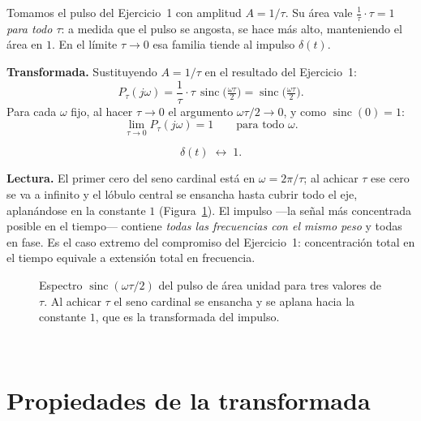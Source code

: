 \documentclass[10pt,a4paper]{article}
\newcommand{\tema}[1]{%
  \bigskip
  \noindent{\color{utnblue}\rule{\linewidth}{1pt}}\\[-0.4em]
  \section*{#1}
  \vspace{-0.6em}
}
\begin{document}
	Tomamos el pulso del Ejercicio~1 con amplitud $A=1/\tau$. Su área vale $\tfrac{1}{\tau}\cdot\tau=1$ \emph{para todo $\tau$}: a medida que el pulso se angosta, se hace más alto, manteniendo el área en $1$. En el límite $\tau\to0$ esa familia tiende al impulso $\delta(t)$.

	\textbf{Transformada.} Sustituyendo $A=1/\tau$ en el resultado del Ejercicio~1:
	\[
		P_\tau(j\omega) = \frac{1}{\tau}\cdot\tau\,\operatorname{sinc}\!\Big(\tfrac{\omega\tau}{2}\Big) = \operatorname{sinc}\!\Big(\tfrac{\omega\tau}{2}\Big).
	\]
	Para cada $\omega$ fijo, al hacer $\tau\to0$ el argumento $\omega\tau/2\to0$, y como $\operatorname{sinc}(0)=1$:
	\[
		\lim_{\tau\to0} P_\tau(j\omega) = 1 \qquad \text{para todo } \omega.
	\]

	\[
		\boxed{\delta(t) \;\leftrightarrow\; 1.}
	\]

	\textbf{Lectura.} El primer cero del seno cardinal está en $\omega=2\pi/\tau$; al achicar $\tau$ ese cero se va a infinito y el lóbulo central se ensancha hasta cubrir todo el eje, aplanándose en la constante $1$ (Figura~\ref{fig:sol_ej3}). El impulso ---la señal más concentrada posible en el tiempo--- contiene \emph{todas las frecuencias con el mismo peso} y todas en fase. Es el caso extremo del compromiso del Ejercicio~1: concentración total en el tiempo equivale a extensión total en frecuencia.

	\begin{figure}[H]
		\centering
		
		\caption{Espectro $\operatorname{sinc}(\omega\tau/2)$ del pulso de área unidad para tres valores de $\tau$. Al achicar $\tau$ el seno cardinal se ensancha y se aplana hacia la constante $1$, que es la transformada del impulso.}
		\label{fig:sol_ej3}
	\end{figure}

	\tema{Propiedades de la transformada}
\end{document}
